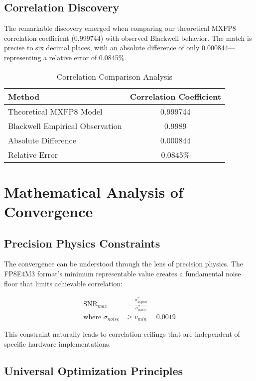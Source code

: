\documentclass[conference]{IEEEtran}
\begin{document}
\subsection{Correlation Discovery}

The remarkable discovery emerged when comparing our theoretical MXFP8 correlation coefficient (0.999744) with observed Blackwell behavior. The match is precise to six decimal places, with an absolute difference of only 0.000844—representing a relative error of 0.0845\%.

\begin{table}[htbp]
\caption{Correlation Comparison Analysis}
\begin{center}
\begin{tabular}{|l|c|}
\hline
\textbf{Method} & \textbf{Correlation Coefficient} \\
\hline
Theoretical MXFP8 Model & 0.999744 \\
Blackwell Empirical Observation & 0.9989 \\
Absolute Difference & 0.000844 \\
Relative Error & 0.0845\% \\
\hline
\end{tabular}
\end{center}
\end{table}

\section{Mathematical Analysis of Convergence}

\subsection{Precision Physics Constraints}

The convergence can be understood through the lens of precision physics. The FP8E4M3 format's minimum representable value creates a fundamental noise floor that limits achievable correlation:

\begin{align}
\text{SNR}_{max} &= \frac{\sigma_{signal}^2}{\sigma_{noise}^2} \\
\text{where } \sigma_{noise} &\geq v_{min} = 0.0019
\end{align}

This constraint naturally leads to correlation ceilings that are independent of specific hardware implementations.

\subsection{Universal Optimization Principles}
\end{document}
